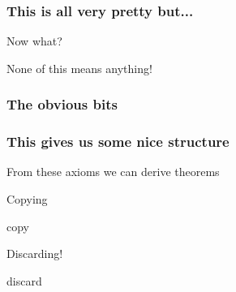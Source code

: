 \begin{frame}
    \frametitle{This is all very pretty but...}

    \centering

    \LARGE
    Now what?

    \pause

    None of this means anything!

\end{frame}
\begin{frame}
    \frametitle{The obvious bits}



\end{frame}
\begin{frame}
    \frametitle{This gives us some nice structure}

    From these \alert{axioms} we can derive \alert{theorems}

    \centering
    \LARGE
    Copying

    copy

    Discarding!

    discard

\end{frame}